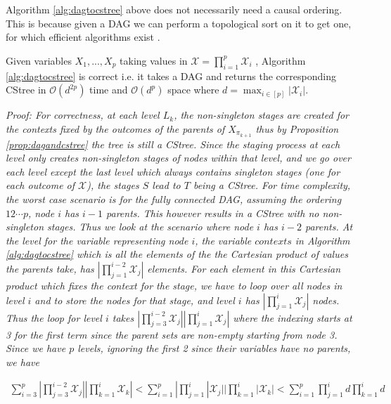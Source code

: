 \documentclass{tufte-book}
\begin{document}
Algorithm \ref{alg:dagtocstree} above does not necessarily need a causal ordering. This is because given a DAG we can perform a topological sort on it to get one, for which efficient algorithms exist \cite{tarjan-1976-edge-disjoin}.

\begin{theorem}\label{thm:dagtocstreecorrectness}
Given variables $X_1,...,X_p$ taking values in $\mathcal{X}=\prod_{i=1}^p \mathcal{X}_i$ , Algorithm \ref{alg:dagtocstree} is correct i.e. it takes a DAG and returns the corresponding CStree in $\mathcal{O}(d^{2p})$ time and $\mathcal{O}(d^p)$ space where $d = \max_{i \in [p]} |\mathcal{X}_i|$.
\end{theorem}

\textit{Proof:
	For correctness, at each level $L_k$, the non-singleton stages are created for the contexts fixed by the outcomes of the parents of $X_{\pi_{k+1}}$ thus by Proposition \ref{prop:dagandcstree} the tree is still a CStree. Since the staging process at each level only creates non-singleton stages of nodes within that level, and we go over each level except the last level which always contains singleton stages (one for each outcome of $\mathcal{X}$), the stages $S$ lead to $T$ being a CStree. For time complexity, the worst case scenario is for the fully connected DAG, assuming the ordering $12\cdots p$, node $i$ has $i-1$ parents. This however results in a CStree with no non-singleton stages. Thus we look at the scenario where node $i$ has $i-2$ parents. At the level for the variable representing node $i$, the variable $contexts$ in Algorithm \ref{alg:dagtocstree} which is all the elements of the the Cartesian product of values the parents take, has $|\prod_{j=1}^{i-2} \mathcal{X}_j|$ elements. For each element in this Cartesian product which fixes the context for the stage, we have to loop over all nodes in level $i$ and to store the nodes for that stage, and level $i$ has $|\prod_{j=1}^i \mathcal{X}_j|$ nodes. Thus the loop for level $i$ takes $|\prod_{j=3}^{i-2} \mathcal{X}_j ||\prod_{j=1}^i \mathcal{X}_j| $ where the indexing starts at 3 for the first term since the parent sets are non-empty starting from node 3. Since we have $p$ levels, ignoring the first 2 since their variables have no parents, we have}

	\begin{align*}\sum_{i=3}^p |\prod_{j=3}^{i-2} \mathcal{X}_j ||\prod_{k=1}^i \mathcal{X}_k| < \sum_{i=1}^p |\prod_{j=1}^i |\mathcal{X}_j||\prod_{k=1}^i |\mathcal{X}_k|< \sum_{i=1}^p \prod_{j=1}^i d \prod_{k=1}^i d 
	\end{align*}
\end{document}
